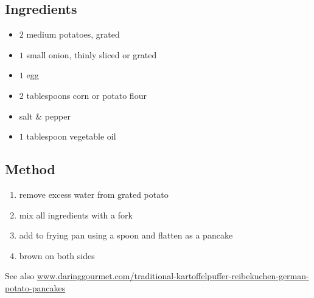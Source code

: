 \documentclass[11pt,a4paper]{article}
\begin{document}
\subsection*{Ingredients}

\begin{multicols}{2}

\begin{itemize}
  \item $ 2 $ medium potatoes, grated
  \item $ 1 $ small onion, thinly sliced or grated
  \item $ 1 $ egg
  \item $ 2 $ tablespoons corn or potato flour
  \item salt \& pepper
\end{itemize}

\columnbreak

\begin{itemize}
  \item $ 1 $ tablespoon vegetable oil
\end{itemize}

\end{multicols}

\medskip

\subsection*{Method}

\begin{enumerate}
  \item remove excess water from grated potato
  \item mix all ingredients with a fork
  \item add to frying pan using a spoon and flatten as a pancake
  \item brown on both sides
\end{enumerate}

See also \href{https://www.daringgourmet.com/traditional-kartoffelpuffer-reibekuchen-german-potato-pancakes/}{www.daringgourmet.com/traditional-kartoffelpuffer-reibekuchen-german-potato-pancakes}
\end{document}
